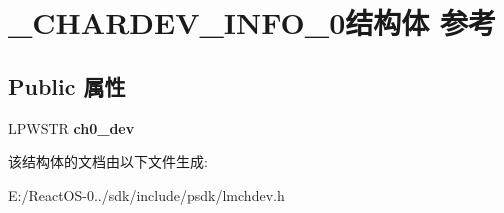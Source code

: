 \hypertarget{struct___c_h_a_r_d_e_v___i_n_f_o__0}{}\section{\+\_\+\+C\+H\+A\+R\+D\+E\+V\+\_\+\+I\+N\+F\+O\+\_\+0结构体 参考}
\label{struct___c_h_a_r_d_e_v___i_n_f_o__0}
\subsection*{Public 属性}
\begin{DoxyCompactItemize}
\item 
\mbox{\label{struct___c_h_a_r_d_e_v___i_n_f_o__0_a8d09a96a788cd01fdf7ffcc95a2f745a}} 
L\+P\+W\+S\+TR {\bfseries ch0\+\_\+dev}
\end{DoxyCompactItemize}


该结构体的文档由以下文件生成\+:\begin{DoxyCompactItemize}
\item 
E\+:/\+React\+O\+S-\/0../sdk/include/psdk/lmchdev.\+h\end{DoxyCompactItemize}
